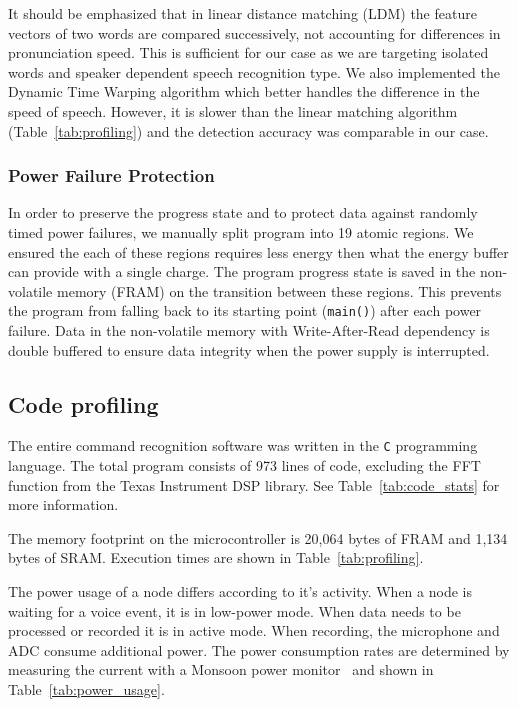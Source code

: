 It should be emphasized that in linear distance matching (LDM) the feature vectors of two words are compared successively, not accounting for differences in pronunciation speed. This is sufficient for our case as we are targeting isolated words and speaker dependent speech recognition type. We also implemented the Dynamic Time Warping algorithm which better handles the difference in the speed of speech. However, it is slower than the linear matching algorithm  (Table~\ref{tab:profiling}) and the detection accuracy was comparable in our case.%

\subsubsection{Power Failure Protection}
In order to preserve the progress state and to protect \cim data against randomly timed power failures, we manually split \cim program into 19 atomic regions. We ensured the each of these regions requires less energy then what the energy buffer can provide with a single charge. The program progress state is saved in the non-volatile memory (FRAM) on the transition between these regions. This prevents the program from falling back to its starting point (\texttt{main()}) after each power failure. Data in the non-volatile memory with Write-After-Read dependency is double buffered to ensure data integrity when the power supply is interrupted. 

\subsection{Code profiling}
The entire command recognition software was written in the {\tt C} programming language. The total program consists of 973 lines of code, excluding the FFT function from the Texas Instrument DSP library. See Table~\ref{tab:code_stats} for more information.

The memory footprint on the microcontroller is 20,064 bytes of FRAM and 1,134 bytes of SRAM. Execution times are shown in Table~\ref{tab:profiling}.

The power usage of a node differs according to it's activity. When a node is waiting for a voice event, it is in low-power mode. When data needs to be processed or recorded it is in active mode. When recording, the microphone and ADC consume additional power. The power consumption rates are determined by measuring the current with a Monsoon power monitor~\cite{monsoon} and shown in Table~\ref{tab:power_usage}.


